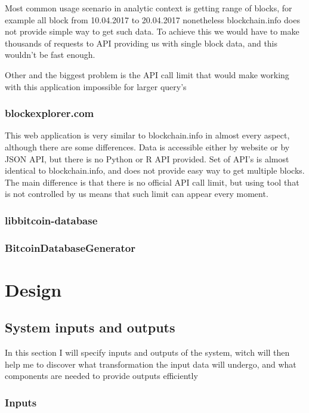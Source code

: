 \documentclass{article}
\begin{document}
Most common usage scenario in analytic context is getting range of blocks, for example all block from 10.04.2017 to 20.04.2017 nonetheless blockchain.info does not provide simple way to get such data. To achieve this we would have to make thousands of requests to API providing us with single block data, and this wouldn't be fast enough.

Other and the biggest problem is the API call limit that would make working with this application impossible for larger query's

\subsubsection*{blockexplorer.com}

This web application is very similar to blockchain.info in almost every aspect, although there are some differences. Data is accessible either by website or by JSON API, but there is no Python or R API provided. Set of API's is almost identical to blockchain.info, and does not provide easy way to get multiple blocks. The main difference is that there is no official API call limit, but using tool that is not controlled by us means that such limit can appear every moment.

\subsubsection*{libbitcoin-database}

\subsubsection*{BitcoinDatabaseGenerator}


\section{Design}

\subsection{System inputs and outputs}

In this section I will specify inputs and outputs of the system, witch will then help me to discover what transformation the input data will undergo, and what components are needed to provide outputs efficiently

\subsubsection{Inputs}
\end{document}
